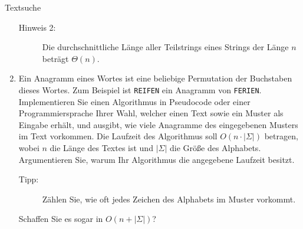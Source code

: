 \documentclass[11pt,a4paper]{article}
\begin{document}
\begin{aufgabe}{3}{Textsuche}
\begin{enumerate}[label=\alph*)]
\begin{description}
            \item[Hinweis 2:] Die durchschnittliche Länge aller Teilstrings eines Strings der Länge $n$ beträgt $\Theta(n)$.
        \end{description}
        \item Ein Anagramm eines Wortes ist eine beliebige Permutation der Buchstaben dieses Wortes.
        Zum Beispiel ist \texttt{REIFEN} ein Anagramm von \texttt{FERIEN}.
        Implementieren Sie einen Algorithmus in Pseudocode oder einer Programmiersprache Ihrer Wahl, welcher einen Text sowie ein Muster als Eingabe erhält, und ausgibt, wie viele Anagramme des eingegebenen Musters im Text vorkommen.
        Die Laufzeit des Algorithmus soll $O(n \cdot |\Sigma|)$ betragen, wobei $n$ die Länge des Textes ist und $|\Sigma|$ die Größe des Alphabets.
        Argumentieren Sie, warum Ihr Algorithmus die angegebene Laufzeit besitzt.
        \begin{description}
            \item[Tipp:] Zählen Sie, wie oft jedes Zeichen des Alphabets im Muster vorkommt.
        \end{description}
        Schaffen Sie es sogar in $O(n + |\Sigma|)$?
    \end{enumerate}
    
\end{aufgabe}
\end{document}
